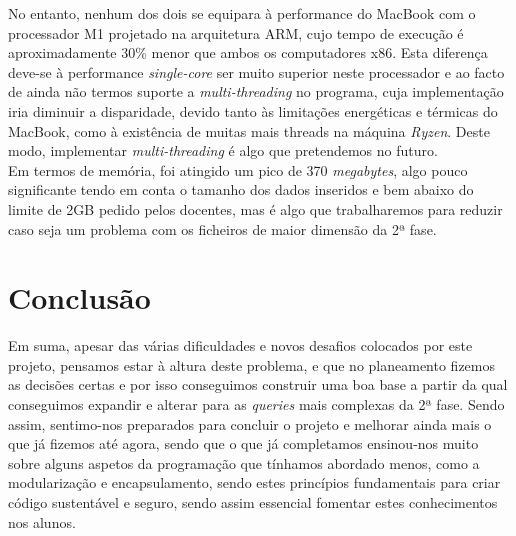 \documentclass[12pt,a4paper]{report}
\begin{document}
    No entanto, nenhum dos dois se equipara à performance do MacBook com o processador M1 projetado na arquitetura ARM, cujo tempo de execução é aproximadamente 30\% menor que ambos os computadores x86. Esta diferença deve-se à performance \textit{single-core} ser muito superior neste processador e ao facto de ainda não termos suporte a \textit{multi-threading} no programa, cuja implementação iria diminuir a disparidade, devido tanto às limitações energéticas e térmicas do MacBook, como à existência de muitas mais threads na máquina \textit{Ryzen}. Deste modo, implementar \textit{multi-threading} é algo que pretendemos no futuro. \\
    Em termos de memória, foi atingido um pico de 370 \textit{megabytes}, algo pouco significante tendo em conta o tamanho dos dados inseridos e bem abaixo do limite de 2GB pedido pelos docentes, mas é algo que trabalharemos para reduzir caso seja um problema com os ficheiros de maior dimensão da 2ª fase.
\newpage

    \chapter{Conclusão}
        Em suma, apesar das várias dificuldades e novos desafios colocados por este projeto, pensamos estar à altura deste problema, e que no planeamento fizemos as decisões certas e por isso conseguimos construir uma boa base a partir da qual conseguimos expandir e alterar para as \textit{queries} mais complexas da 2ª fase. Sendo assim, sentimo-nos preparados para concluir o projeto e melhorar ainda mais o que já fizemos até agora, sendo que o que já completamos ensinou-nos muito sobre alguns aspetos da programação que tínhamos abordado menos, como a modularização e encapsulamento, sendo estes princípios fundamentais para criar código sustentável e seguro, sendo assim essencial fomentar estes conhecimentos nos alunos.
\end{document}
